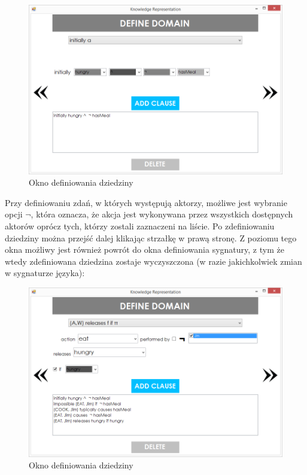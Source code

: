 \documentclass{article}
\begin{document}
\begin{figure}[H]
\centering
\includegraphics[scale=0.4]{08}
\caption{Okno definiowania dziedziny}
\end{figure}

\newpage
Przy definiowaniu zdań, w których występują aktorzy, możliwe jest wybranie opcji {\large{$\neg$}}, która oznacza, że akcja jest wykonywana przez wszystkich dostępnych aktorów oprócz tych, którzy zostali zaznaczeni na liście. Po zdefiniowaniu dziedziny można przejść dalej klikając strzałkę w prawą stronę. Z poziomu tego okna możliwy jest również powrót do okna definiowania sygnatury, z tym że wtedy zdefiniowana dziedzina zostaje wyczyszczona (w razie jakichkolwiek zmian w sygnaturze języka):

\begin{figure}[H]
\centering
\includegraphics[scale=0.4]{09}
\caption{Okno definiowania dziedziny}
\end{figure}
\end{document}
